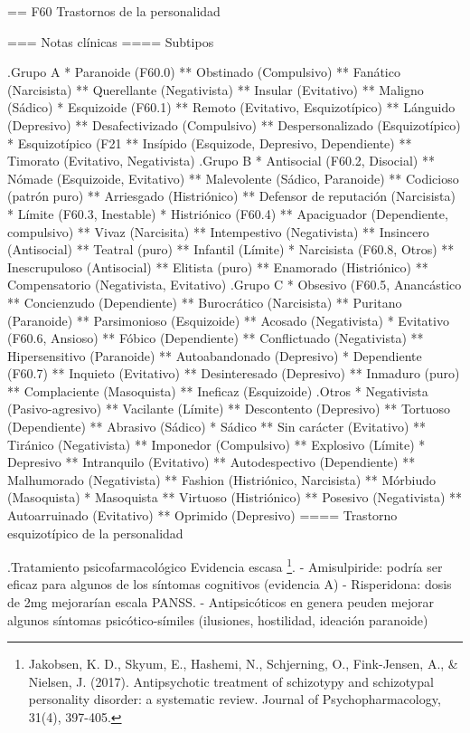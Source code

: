 == F60 Trastornos de la personalidad

=== Notas clínicas
==== Subtipos

.Grupo A
* Paranoide (F60.0)
** Obstinado (Compulsivo)
** Fanático (Narcisista)
** Querellante (Negativista)
** Insular (Evitativo)
** Maligno (Sádico)
* Esquizoide (F60.1)
** Remoto (Evitativo, Esquizotípico)
** Lánguido (Depresivo)
** Desafectivizado (Compulsivo)
** Despersonalizado (Esquizotípico)
* Esquizotípico (F21
** Insípido (Esquizode, Depresivo, Dependiente)
** Timorato (Evitativo, Negativista)
.Grupo B
* Antisocial (F60.2, Disocial)
** Nómade (Esquizoide, Evitativo)
** Malevolente (Sádico, Paranoide)
** Codicioso (patrón puro)
** Arriesgado (Histriónico)
** Defensor de reputación (Narcisista)
* Límite (F60.3, Inestable)
* Histriónico (F60.4)
** Apaciguador (Dependiente, compulsivo)
** Vivaz (Narcisita)
** Intempestivo (Negativista)
** Insincero (Antisocial)
** Teatral (puro)
** Infantil (Límite)
* Narcisista (F60.8, Otros)
** Inescrupuloso (Antisocial)
** Elitista (puro)
** Enamorado (Histriónico)
** Compensatorio (Negativista, Evitativo)
.Grupo C
* Obsesivo (F60.5, Anancástico
** Concienzudo (Dependiente)
** Burocrático (Narcisista)
** Puritano (Paranoide)
** Parsimonioso (Esquizoide)
** Acosado (Negativista)
* Evitativo (F60.6, Ansioso)
** Fóbico (Dependiente)
** Conflictuado (Negativista)
** Hipersensitivo (Paranoide)
** Autoabandonado (Depresivo)
* Dependiente (F60.7)
** Inquieto (Evitativo)
** Desinteresado (Depresivo)
** Inmaduro (puro)
** Complaciente (Masoquista)
** Ineficaz (Esquizoide)
.Otros
* Negativista (Pasivo-agresivo)
** Vacilante (Límite)
** Descontento (Depresivo)
** Tortuoso (Dependiente)
** Abrasivo (Sádico)
* Sádico
** Sin carácter (Evitativo)
** Tiránico (Negativista)
** Imponedor (Compulsivo)
** Explosivo (Límite)
* Depresivo
** Intranquilo (Evitativo)
** Autodespectivo (Dependiente)
** Malhumorado (Negativista)
** Fashion (Histriónico, Narcisista)
** Mórbiudo (Masoquista)
* Masoquista
** Virtuoso (Histriónico)
** Posesivo (Negativista)
** Autoarruinado (Evitativo)
** Oprimido (Depresivo)
==== Trastorno esquizotípico de la personalidad

.Tratamiento psicofarmacológico
Evidencia escasa \footnote{Jakobsen, K. D., Skyum, E., Hashemi, N., Schjerning, O., Fink-Jensen, A., \& Nielsen, J. (2017). Antipsychotic treatment of schizotypy and schizotypal personality disorder: a systematic review. Journal of Psychopharmacology, 31(4), 397-405.}.
- Amisulpiride: podría ser eficaz para algunos de los síntomas cognitivos (evidencia A)
- Risperidona: dosis de 2mg mejorarían escala PANSS.
- Antipsicóticos en genera peuden mejorar algunos síntomas psicótico-símiles (ilusiones, hostilidad, ideación paranoide)

